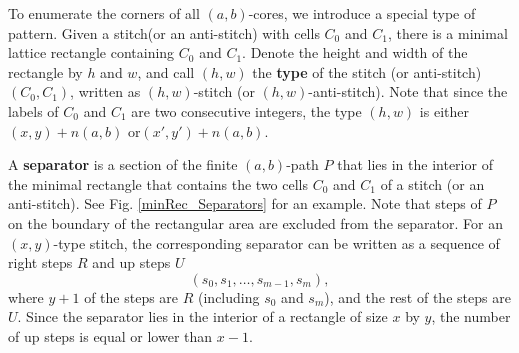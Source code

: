 \documentclass[a4paper,12pt]{article}
\begin{document}
To enumerate the corners of all $(a,b)$-cores, we introduce a special type of pattern.
Given  a stitch(or an anti-stitch) with cells $C_0$ and $C_1$, there is a minimal lattice rectangle containing $C_0$ and $C_1$. Denote the height and  width of the rectangle by $h$ and $w$, and call $(h,w)$  the \textbf{type} of the stitch (or anti-stitch) $(C_0,C_1)$, written as $(h,w)$-stitch (or $(h,w)$-anti-stitch). Note that since the labels of  $C_0$ and $C_1$ are two consecutive integers,  the type $(h,w)$ is either $(x,y)+n(a,b)$ or$(x',y')+n(a,b)$.


A \textbf{{separator}} is a section of the finite $(a,b)$-path $P$ that lies in the interior of the minimal rectangle that contains the two cells $C_0$ and $C_1$ of a stitch (or an anti-stitch). See Fig. \ref{minRec_Separators} for an example.
Note that steps of $P$ on the boundary of the rectangular area are excluded from the separator.
For an $(x,y)$-type stitch, the corresponding  separator can be written as a sequence of right steps $R$ and up steps $U$
$$(s_0,s_1,\ldots,s_{m-1},s_m),$$
where   $y+1$ of the steps are $R$ (including $s_0$ and $s_m$), and the rest of the steps are $U$. Since the separator lies in the interior of a rectangle of size $x$ by $y$, the number of up steps is equal or lower than $x-1$.

 
\end{document}
